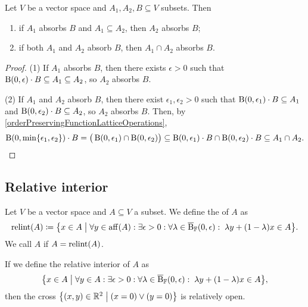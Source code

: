 \begin{proposition} \label{absorbingSetProperties}
Let $V$ be a vector space and $A_1, A_2, B\subseteq V$ subsets. Then
\begin{enumerate}
\item if $A_1$ absorbs $B$ and $A_1\subseteq A_2$, then $A_2$ absorbs $B$;
\item if both $A_1$ and $A_2$ absorb $B$, then $A_1\cap A_2$ absorbs $B$.
\end{enumerate}
\end{proposition}
\begin{proof}
(1) If $A_1$ absorbs $B$, then there exists $\epsilon >0$ such that $\operatorname{B}(0,\epsilon)\cdot B\subseteq A_1 \subseteq A_2$, so $A_2$ absorbs $B$.

(2) If $A_1$ and $A_2$ absorb $B$, then there exist $\epsilon_1, \epsilon_2 >0$ such that $\operatorname{B}(0,\epsilon_1)\cdot B\subseteq A_1$ and $\operatorname{B}(0,\epsilon_2)\cdot B\subseteq A_2$, so $A_2$ absorbs $B$. Then, by \ref{orderPreservingFunctionLatticeOperations},
\[ \operatorname{B}(0,\min\{\epsilon_1, \epsilon_2\})\cdot B = \big(\operatorname{B}(0,\epsilon_1) \cap \operatorname{B}(0,\epsilon_2)\big) \subseteq \operatorname{B}(0,\epsilon_1)\cdot B \cap \operatorname{B}(0,\epsilon_2)\cdot B \subseteq A_1 \cap A_2. \]
\end{proof}

\subsection{Relative interior}
\begin{definition}
Let $V$ be a vector space and $A\subseteq V$ a subset. We define the  of $A$ as
\[ \relint(A) \defeq \setbuilder{x\in A}{\forall y\in \affine(A): \exists \epsilon >0: \forall \lambda \in \cball_\F(0,\epsilon):\; \lambda y + (1-\lambda) x \in A}. \]
We call $A$  if $A = \operatorname{relint}(A)$. 
\end{definition}

\begin{example}
If we define the relative interior of $A$ as
\[\setbuilder{x\in A}{\forall y\in A: \exists \epsilon >0: \forall \lambda \in \cball_\F(0,\epsilon):\; \lambda y + (1-\lambda) x \in A}, \]
then the cross $\setbuilder{(x,y)\in \R^2}{(x=0)\lor (y=0)}$ is relatively open.
\end{example}


